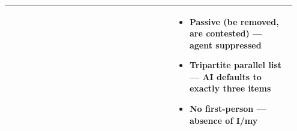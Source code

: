 \documentclass[11pt]{article}
\begin{document}
\begin{longtable}{|p{0.55\linewidth}|p{0.40\linewidth}|}
\hline
\rule[-3.5cm]{0pt}{3.5cm} & \begin{itemize}[leftmargin=1em,itemsep=1pt,topsep=1pt,parsep=0pt]
  \item Passive (be removed, are contested) --- agent suppressed
  \item Tripartite parallel list --- AI defaults to exactly three items
  \item No first-person --- absence of I/my
\end{itemize} \\
\hline
\end{longtable}
\end{document}
